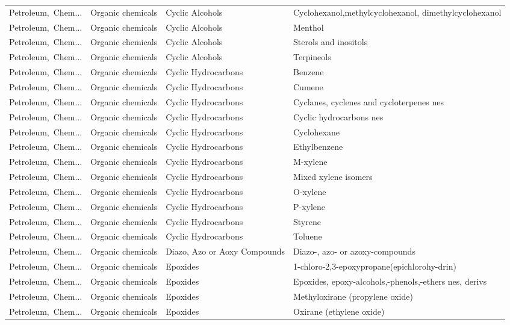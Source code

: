 \begin{appendices}
\begin{xltabular}{\textwidth}{|p{0.10\textwidth}|p{0.25\textwidth}|p{0.24\textwidth}|p{0.31\textwidth}|}
Petroleum,\ Chem... & Organic chemicals & Cyclic Alcohols & Cyclohexanol,methylcyclohexanol, dimethylcyclohexanol \\
Petroleum,\ Chem... & Organic chemicals & Cyclic Alcohols & Menthol \\
Petroleum,\ Chem... & Organic chemicals & Cyclic Alcohols & Sterols and inositols \\
Petroleum,\ Chem... & Organic chemicals & Cyclic Alcohols & Terpineols \\
Petroleum,\ Chem... & Organic chemicals & Cyclic Hydrocarbons & Benzene \\
Petroleum,\ Chem... & Organic chemicals & Cyclic Hydrocarbons & Cumene \\
Petroleum,\ Chem... & Organic chemicals & Cyclic Hydrocarbons & Cyclanes, cyclenes and cycloterpenes nes \\
Petroleum,\ Chem... & Organic chemicals & Cyclic Hydrocarbons & Cyclic hydrocarbons nes \\
Petroleum,\ Chem... & Organic chemicals & Cyclic Hydrocarbons & Cyclohexane \\
Petroleum,\ Chem... & Organic chemicals & Cyclic Hydrocarbons & Ethylbenzene \\
Petroleum,\ Chem... & Organic chemicals & Cyclic Hydrocarbons & M-xylene \\
Petroleum,\ Chem... & Organic chemicals & Cyclic Hydrocarbons & Mixed xylene isomers \\
Petroleum,\ Chem... & Organic chemicals & Cyclic Hydrocarbons & O-xylene \\
Petroleum,\ Chem... & Organic chemicals & Cyclic Hydrocarbons & P-xylene \\
Petroleum,\ Chem... & Organic chemicals & Cyclic Hydrocarbons & Styrene \\
Petroleum,\ Chem... & Organic chemicals & Cyclic Hydrocarbons & Toluene \\
Petroleum,\ Chem... & Organic chemicals & Diazo, Azo or Aoxy Compounds & Diazo-, azo- or azoxy-compounds \\
Petroleum,\ Chem... & Organic chemicals & Epoxides & 1-chloro-2,3-epoxypropane(epichlorohy-drin) \\
Petroleum,\ Chem... & Organic chemicals & Epoxides & Epoxides, epoxy-alcohols,-phenols,-ethers nes, derivs \\
Petroleum,\ Chem... & Organic chemicals & Epoxides & Methyloxirane (propylene oxide) \\
Petroleum,\ Chem... & Organic chemicals & Epoxides & Oxirane (ethylene oxide) \\

\end{xltabular}
\end{appendices}
